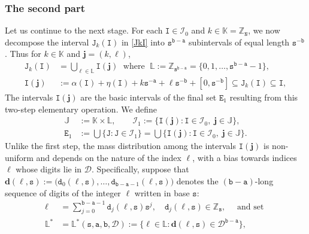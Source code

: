\documentclass[12pt, twoside]{article}
\theoremstyle{definition}
\numberwithin{equation}{section}
\begin{document}
\subsubsection{The second part} \label{second-step-section}  
Let us continue to the next stage. For each $\mathtt I \in \mathscr{I}_0$ and $k \in \mathbb K = \mathbb Z_{\mathtt N}$, we now decompose the interval $\mathtt J_k(\mathtt I)$ in \eqref{JkI} into $\mathtt s^{\mathtt b - \mathtt a}$ subintervals of equal length $\mathtt s^{-\mathtt b}$. Thus for $k \in \mathbb K$ and $\mathbf j = (k, \ell)$, 
\begin{align} \label{step-2-decomp}
\mathtt J_k(\mathtt I) &= \bigcup_{\ell \in \mathbb L} \mathtt I (\mathbf j)  \; \text{ where } \; \mathbb L := \mathbb Z_{\mathtt s^{\mathtt b-\mathtt a}} = \bigl\{0, 1, \ldots, \mathtt s^{\mathtt b - \mathtt a} - 1\bigr\},  \\ 
\mathtt I (\mathbf j)  &:= \alpha(\mathtt I) + \eta(\mathtt I) + k\mathtt s^{-\mathtt a} + \ell \mathtt s^{-\mathtt b} + [0, \mathtt s^{-\mathtt b}] \subseteq \mathtt J_k(\mathtt I) \subseteq \mathtt I, \label{step-2-basic}
\end{align} 
The intervals $\mathtt I(\mathbf j)$ are the basic intervals of the final set $\mathtt E_1$ resulting from this two-step elementary operation. We define
\begin{align} 
\mathbb J &:= \mathbb K\times \mathbb L, \qquad \mathscr{I}_1 := \bigl\{\mathtt I(\mathbf j) : \mathtt I \in \mathscr{I}_0, \; \mathbf j \in \mathbb J  \bigr\},  \label{JKL} \\ \mathtt E_1 &:= \bigcup \bigl\{\mathtt J : \mathtt J \in \mathscr{I}_1 \bigr\} = \bigcup \bigl\{ \mathtt I(\mathbf j) : \mathtt I \in \mathscr{I}_0, \; \mathbf j \in \mathbb J\bigr\}. \label{E1}
\end{align} 
Unlike the first step, the mass distribution among the intervals $\mathtt I(\mathbf j)$ is non-uniform and depends on the nature of the index $\ell$, with a bias towards indices $\ell$ whose digits lie in $\mathscr{D}$. Specifically, suppose that $\mathbf d(\ell, \mathtt s) := \bigl(\mathtt d_0(\ell, \mathtt s), \ldots, \mathtt d_{\mathtt b - \mathtt a-1}(\ell, \mathtt s) \bigr) $ denotes the $(\mathtt b - \mathtt a)$-long sequence of digits of the integer $\ell$ written in base $\mathtt s$: 
\begin{align} \ell &= \sum_{j=0}^{\mathtt b - \mathtt a-1} \mathtt d_j(\ell, \mathtt s) \mathtt s^j, \quad \mathtt d_j(\ell, \mathtt s) \in \mathbb Z_{\mathtt s}, \quad  \text{ and set } \label{rep-l-s} \\ \mathbb L^{\ast} &= \mathbb L^{\ast}(\mathtt s, \mathtt a, \mathtt b, \mathscr{D}) := \bigl\{\ell \in \mathbb L : \mathbf d(\ell, \mathtt s) \in \mathscr{D}^{\mathtt b- \mathtt a} \bigr\},  \label{L*}
\end{align} 
\end{document}
